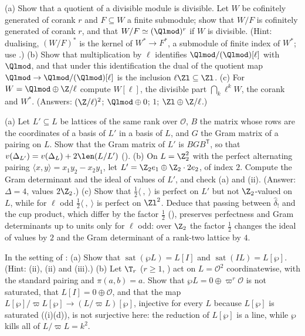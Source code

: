 \begin{exercise}\label{ex:modules:ex-cofinite}
(a) Show that a quotient of a divisible module is divisible. Let $W$ be cofinitely generated of corank $r$ and $F\subseteq W$ a finite submodule;
show that $W/F$ is cofinitely generated of corank $r$, and that $W/F\simeq(\Qlmod)^r$ if $W$ is divisible. (Hint: dualising, $(W/F)^*$ is the kernel of
$W^*\to F^*$, a submodule of finite index of $W^*$; use .)
(b) Show that multiplication by $\ell$ identifies $\Qlmod/(\Qlmod)[\ell]$ with $\Qlmod$, and that under this identification the dual of the quotient map
$\Qlmod\to\Qlmod/(\Qlmod)[\ell]$ is the inclusion $\ell\Zl\subseteq\Zl$.
(c) For $W=\Qlmod\oplus\Z/\ell$ compute $W[\ell]$, the divisible part $\bigcap_k\ell^kW$, the corank and $W^*$. (Answers: $(\Z/\ell)^2$; $\Qlmod\oplus0$; $1$;
$\Zl\oplus\Z/\ell$.)
\end{exercise}

\begin{exercise}\label{ex:modules:ex-gram-index}
(a) Let $L'\subseteq L$ be lattices of the same rank over $\mathcal O$, $B$ the matrix whose rows are the coordinates of a basis of $L'$ in a basis of $L$, and $G$
the Gram matrix of a pairing on $L$. Show that the Gram matrix of $L'$ is $BGB^{\mathsf T}$, so that $v(\Delta_{L'})=v(\Delta_L)+2\len(L/L')$
().
(b) On $L=\Z_2^2$ with the perfect alternating pairing $\langle x,y\rangle=x_1y_2-x_2y_1$, let $L'=\Z_2e_1\oplus\Z_2\cdot2e_2$, of index $2$. Compute the Gram
determinant and the ideal of values of $L'$, and check (a) and (ii). (Answer: $\Delta=4$, values $2\Z_2$.)
(c) Show that $\frac12\langle\ ,\ \rangle$ is perfect on $L'$ but not $\Z_2$-valued on $L$, while for $\ell$ odd $\frac12\langle\ ,\ \rangle$ is perfect on $\Zl^2$. Deduce
that passing between $\hat\delta_!$ and the cup product, which differ by the factor $\frac12$ (), preserves perfectness and Gram
determinants up to units only for $\ell$ odd: over $\Z_2$ the factor $\frac12$ changes the ideal of values by $2$ and
the Gram determinant of a rank-two lattice by $4$.
\end{exercise}

\begin{exercise}\label{ex:modules:ex-saturation}
In the setting of :
(a) Show that $\operatorname{sat}(\wp L)=L[I]$ and $\operatorname{sat}(IL)=L[\wp]$. (Hint: (ii), (ii)
and (iii).)
(b) Let $\T_r$ ($r\ge1$, ) act on $L=\mathcal O^2$ coordinatewise, with the standard pairing and $\pi(a,b)=a$. Show that
$\wp L=0\oplus\varpi^r\mathcal O$ is not saturated, that $L[I]=0\oplus\mathcal O$, and that the map $L[\wp]/\varpi L[\wp]\to(L/\varpi L)[\wp]$, injective for
every $L$ because $L[\wp]$ is saturated ((i)(d)), is not surjective here: the reduction of $L[\wp]$ is a line, while $\wp$
kills all of $L/\varpi L=k^2$.
\end{exercise}

